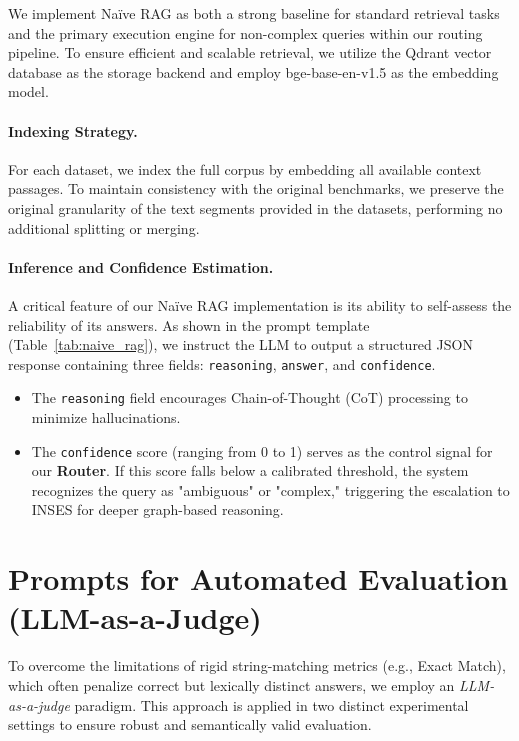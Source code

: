 \documentclass{article}
\theoremstyle{plain}
\theoremstyle{definition}
\theoremstyle{remark}
\begin{document}
We implement Naïve RAG as both a strong baseline for standard retrieval tasks and the primary execution engine for non-complex queries within our routing pipeline. To ensure efficient and scalable retrieval, we utilize the Qdrant vector database as the storage backend and employ bge-base-en-v1.5 as the embedding model.

\paragraph{Indexing Strategy.}
For each dataset, we index the full corpus by embedding all available context passages. To maintain consistency with the original benchmarks, we preserve the original granularity of the text segments provided in the datasets, performing no additional splitting or merging.

\paragraph{Inference and Confidence Estimation.}
A critical feature of our Naïve RAG implementation is its ability to self-assess the reliability of its answers. As shown in the prompt template (Table~\ref{tab:naive_rag}), we instruct the LLM to output a structured JSON response containing three fields: \texttt{reasoning}, \texttt{answer}, and \texttt{confidence}.
\begin{itemize}
    \item The \texttt{reasoning} field encourages Chain-of-Thought (CoT) processing to minimize hallucinations.
    \item The \texttt{confidence} score (ranging from 0 to 1) serves as the control signal for our \textbf{Router}. If this score falls below a calibrated threshold, the system recognizes the query as "ambiguous" or "complex," triggering the escalation to INSES for deeper graph-based reasoning.
\end{itemize}


\section{Prompts for Automated Evaluation (LLM-as-a-Judge)} \label{HH}
To overcome the limitations of rigid string-matching metrics (e.g., Exact Match), which often penalize correct but lexically distinct answers, we employ an \textit{LLM-as-a-judge} paradigm. This approach is applied in two distinct experimental settings to ensure robust and semantically valid evaluation.
\end{document}
